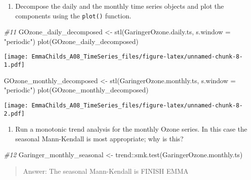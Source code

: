 \documentclass[
]{article}
\newenvironment{Shaded}{\begin{snugshade}}{\end{snugshade}}
\newcommand{\AttributeTok}[1]{\textcolor[rgb]{0.77,0.63,0.00}{#1}}
\newcommand{\CommentTok}[1]{\textcolor[rgb]{0.56,0.35,0.01}{\textit{#1}}}
\newcommand{\FunctionTok}[1]{\textcolor[rgb]{0.00,0.00,0.00}{#1}}
\newcommand{\NormalTok}[1]{#1}
\newcommand{\OtherTok}[1]{\textcolor[rgb]{0.56,0.35,0.01}{#1}}
\newcommand{\SpecialCharTok}[1]{\textcolor[rgb]{0.00,0.00,0.00}{#1}}
\newcommand{\StringTok}[1]{\textcolor[rgb]{0.31,0.60,0.02}{#1}}
\providecommand{\tightlist}{%
  \setlength{\itemsep}{0pt}\setlength{\parskip}{0pt}}
\begin{document}
\begin{enumerate}
\def\labelenumi{\arabic{enumi}.}
\setcounter{enumi}{10}
\tightlist
\item
  Decompose the daily and the monthly time series objects and plot the
  components using the \texttt{plot()} function.
\end{enumerate}

\begin{Shaded}
\begin{Highlighting}[]
\CommentTok{\#11}
\NormalTok{GOzone\_daily\_decomposed }\OtherTok{\textless{}{-}} \FunctionTok{stl}\NormalTok{(GaringerOzone.daily.ts, }\AttributeTok{s.window =} \StringTok{"periodic"}\NormalTok{)}
\FunctionTok{plot}\NormalTok{(GOzone\_daily\_decomposed)}
\end{Highlighting}
\end{Shaded}

\texttt{[image: EmmaChilds\_A08\_TimeSeries\_files/figure-latex/unnamed-chunk-8-1.pdf]}

\begin{Shaded}
\begin{Highlighting}[]
\NormalTok{GOzone\_monthly\_decomposed }\OtherTok{\textless{}{-}} \FunctionTok{stl}\NormalTok{(GaringerOzone.monthly.ts, }\AttributeTok{s.window =} \StringTok{"periodic"}\NormalTok{)}
\FunctionTok{plot}\NormalTok{(GOzone\_monthly\_decomposed)}
\end{Highlighting}
\end{Shaded}

\texttt{[image: EmmaChilds\_A08\_TimeSeries\_files/figure-latex/unnamed-chunk-8-2.pdf]}

\begin{enumerate}
\def\labelenumi{\arabic{enumi}.}
\setcounter{enumi}{11}
\tightlist
\item
  Run a monotonic trend analysis for the monthly Ozone series. In this
  case the seasonal Mann-Kendall is most appropriate; why is this?
\end{enumerate}

\begin{Shaded}
\begin{Highlighting}[]
\CommentTok{\#12}
\NormalTok{Garinger\_monthly\_seasonal }\OtherTok{\textless{}{-}}\NormalTok{ trend}\SpecialCharTok{::}\FunctionTok{smk.test}\NormalTok{(GaringerOzone.monthly.ts)}
\end{Highlighting}
\end{Shaded}

\begin{quote}
Answer: The seasonal Mann-Kendall is FINISH EMMA
\end{quote}
\end{document}

